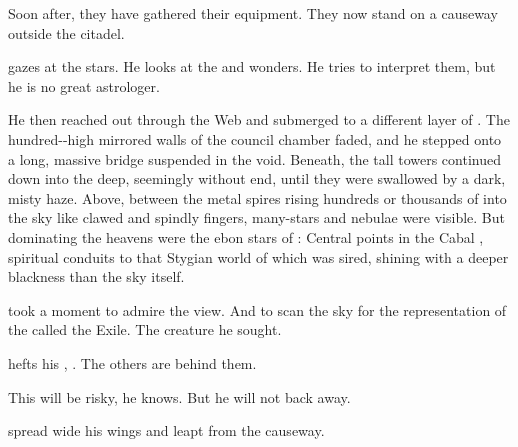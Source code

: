 \begin{garbage}
\begin{comment}
  \subsection{The causeways}
\end{comment}
\new
Soon after, they have gathered their equipment. 
They now stand on a causeway outside the citadel.

\Teshrial{} gazes at the stars.
He looks at the  and wonders. 
He tries to interpret them, but he is no great astrologer. 

He then reached out through the Web and submerged to a different layer of \Nyx. 
The hundred-\metres-high mirrored walls of the council chamber faded, and he stepped onto a long, massive bridge suspended in the void. 
Beneath, the tall towers continued down into the deep, seemingly without end, until they were swallowed by a dark, misty haze. 
Above, between the metal spires rising hundreds or thousands of \metres into the sky like clawed and spindly fingers, many-\coloured stars and nebulae were visible. 
But dominating the heavens were the ebon stars of \Erebos: 
Central \nexus{} points in the Cabal \Matrix, spiritual conduits to that Stygian world of which \Nyx{} was sired, shining with a deeper blackness than the sky itself. 

\Teshrial{} took a moment to admire the view. 
And to scan the sky for the representation of the \vertex{} called the Exile. 
The creature he sought. 

\Teshrial{} hefts his \senaan, . 
The others are behind them. 

This will be risky, he knows. 
But he will not back away. 

\Teshrial{} spread wide his wings and leapt from the causeway. 
 
\end{garbage}









